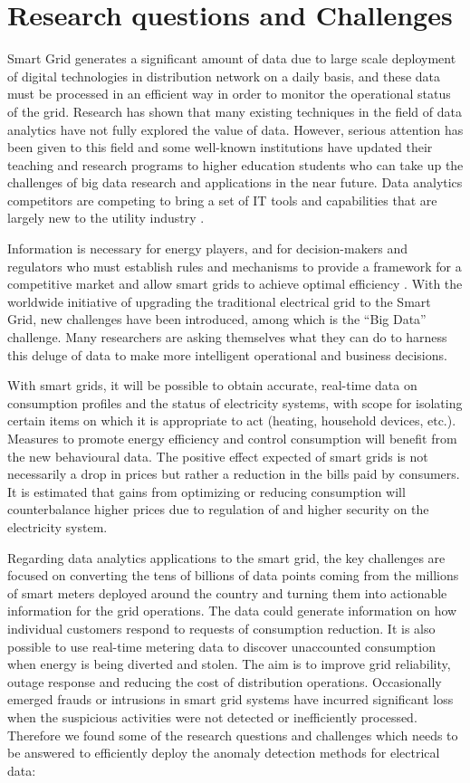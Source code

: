 \chapter{Research questions and Challenges}
Smart Grid generates a significant amount of data due to large scale deployment of digital technologies in distribution network on a daily basis, and these data must be processed in an efficient way in order to monitor the operational status of the grid. Research has shown that many existing techniques in the field of data analytics have not fully explored the value of data. However, serious attention has been given to this field and some well-known institutions have updated their teaching and research programs to higher education students who can take up the challenges of big data research and applications in the near future. Data analytics competitors are competing to bring a set of IT tools and capabilities that are largely new to the utility industry \cite{lai2015big}. 

Information is necessary for energy players, and for decision-makers and regulators who must establish rules and mechanisms to provide a framework for a competitive market and allow smart grids to achieve optimal efficiency \cite{clastres2011smart}. With the worldwide initiative of upgrading the traditional electrical grid to the Smart Grid, new challenges have been introduced, among which is the “Big Data” challenge. Many researchers are asking themselves what they can do to harness this deluge of data to make more intelligent operational and business decisions. 

With smart grids, it will be possible to obtain accurate, real-time data on consumption profiles and the status of electricity systems, with scope for isolating certain items on which it is appropriate to act (heating, household devices, etc.). Measures to promote energy efficiency and control consumption will benefit from the new behavioural data. The positive effect expected of smart grids is not necessarily a drop in prices but rather a reduction in the bills paid by consumers. It is estimated that gains from optimizing or reducing consumption will counterbalance higher prices due to regulation of and higher security on the electricity system\cite{clastres2011smart}. 

Regarding data analytics applications to the smart grid, the key challenges are focused on converting the tens of billions of data points coming from the millions of smart meters deployed around the country and turning them into actionable information for the grid operations. The data could generate information on how individual customers respond to requests of consumption reduction. It is also possible to use real-time metering data to discover unaccounted consumption when energy is being diverted and stolen. The aim is to improve grid reliability, outage response and reducing the cost of distribution operations. Occasionally emerged frauds or intrusions in smart grid systems have incurred significant loss when the suspicious activities were not detected or inefficiently processed. Therefore we found some of the research questions and challenges which needs to be answered to efficiently deploy the anomaly detection methods for electrical data:

